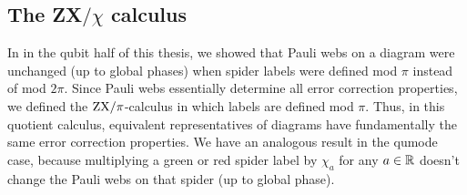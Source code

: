 \subsection{The ZX$/\chi$ calculus}\label{subsec:zx_mod_chi}

In  in the qubit half of this thesis, we showed that Pauli webs on a diagram were unchanged (up to global phases) when spider labels were defined mod $\pi$ instead of mod $2\pi$.
Since Pauli webs essentially determine all error correction properties, we defined the $\text{ZX}/\pi$-calculus in which labels are defined mod $\pi$.
Thus, in this quotient calculus, equivalent representatives of diagrams have fundamentally the same error correction properties.
We have an analogous result in the qumode case, because multiplying a green or red spider label by $\chi_a$ for any $a \in \mathbb{R}$ doesn't change the Pauli webs on that spider (up to global phase).

